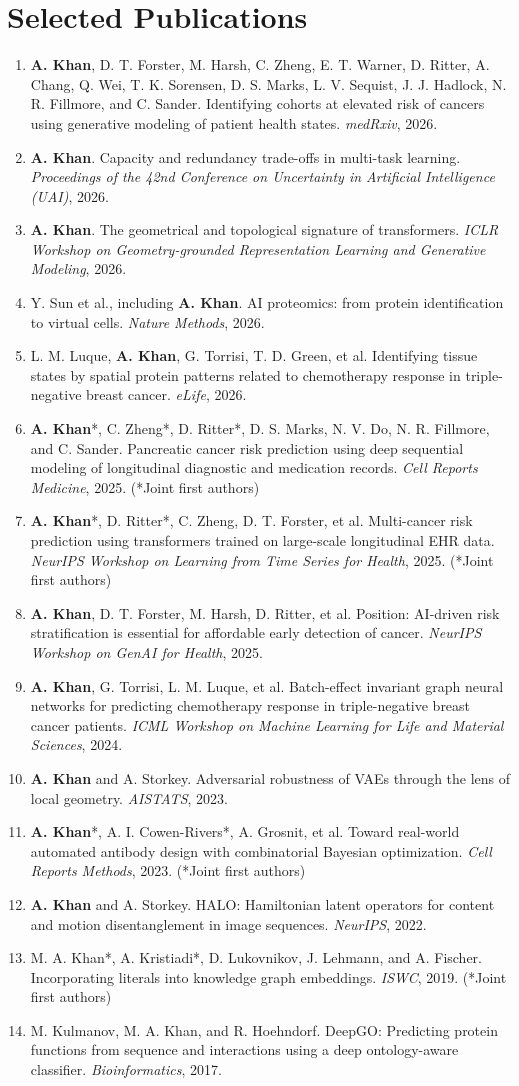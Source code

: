 \documentclass[10pt,a4paper]{article}
\newcommand{\pub}[1]{\item #1}
\begin{document}
\section{Selected Publications}
\begin{enumerate}[leftmargin=1.55em,itemsep=3pt]
\pub{\textbf{A. Khan}, D. T. Forster, M. Harsh, C. Zheng, E. T. Warner, D. Ritter, A. Chang, Q. Wei, T. K. Sorensen, D. S. Marks, L. V. Sequist, J. J. Hadlock, N. R. Fillmore, and C. Sander. Identifying cohorts at elevated risk of cancers using generative modeling of patient health states. \textit{medRxiv}, 2026.}
\pub{\textbf{A. Khan}. Capacity and redundancy trade-offs in multi-task learning. \textit{Proceedings of the 42nd Conference on Uncertainty in Artificial Intelligence (UAI)}, 2026.}
\pub{\textbf{A. Khan}. The geometrical and topological signature of transformers. \textit{ICLR Workshop on Geometry-grounded Representation Learning and Generative Modeling}, 2026.}
\pub{Y. Sun et al., including \textbf{A. Khan}. AI proteomics: from protein identification to virtual cells. \textit{Nature Methods}, 2026.}
\pub{L. M. Luque, \textbf{A. Khan}, G. Torrisi, T. D. Green, et al. Identifying tissue states by spatial protein patterns related to chemotherapy response in triple-negative breast cancer. \textit{eLife}, 2026.}
\pub{\textbf{A. Khan}*, C. Zheng*, D. Ritter*, D. S. Marks, N. V. Do, N. R. Fillmore, and C. Sander. Pancreatic cancer risk prediction using deep sequential modeling of longitudinal diagnostic and medication records. \textit{Cell Reports Medicine}, 2025. (*Joint first authors)}
\pub{\textbf{A. Khan}*, D. Ritter*, C. Zheng, D. T. Forster, et al. Multi-cancer risk prediction using transformers trained on large-scale longitudinal EHR data. \textit{NeurIPS Workshop on Learning from Time Series for Health}, 2025. (*Joint first authors)}
\pub{\textbf{A. Khan}, D. T. Forster, M. Harsh, D. Ritter, et al. Position: AI-driven risk stratification is essential for affordable early detection of cancer. \textit{NeurIPS Workshop on GenAI for Health}, 2025.}
\pub{\textbf{A. Khan}, G. Torrisi, L. M. Luque, et al. Batch-effect invariant graph neural networks for predicting chemotherapy response in triple-negative breast cancer patients. \textit{ICML Workshop on Machine Learning for Life and Material Sciences}, 2024.}
\pub{\textbf{A. Khan} and A. Storkey. Adversarial robustness of VAEs through the lens of local geometry. \textit{AISTATS}, 2023.}
\pub{\textbf{A. Khan}*, A. I. Cowen-Rivers*, A. Grosnit, et al. Toward real-world automated antibody design with combinatorial Bayesian optimization. \textit{Cell Reports Methods}, 2023. (*Joint first authors)}
\pub{\textbf{A. Khan} and A. Storkey. HALO: Hamiltonian latent operators for content and motion disentanglement in image sequences. \textit{NeurIPS}, 2022.}
\pub{M. A. Khan*, A. Kristiadi*, D. Lukovnikov, J. Lehmann, and A. Fischer. Incorporating literals into knowledge graph embeddings. \textit{ISWC}, 2019. (*Joint first authors)}
\pub{M. Kulmanov, M. A. Khan, and R. Hoehndorf. DeepGO: Predicting protein functions from sequence and interactions using a deep ontology-aware classifier. \textit{Bioinformatics}, 2017.}
\end{enumerate}
\end{document}
